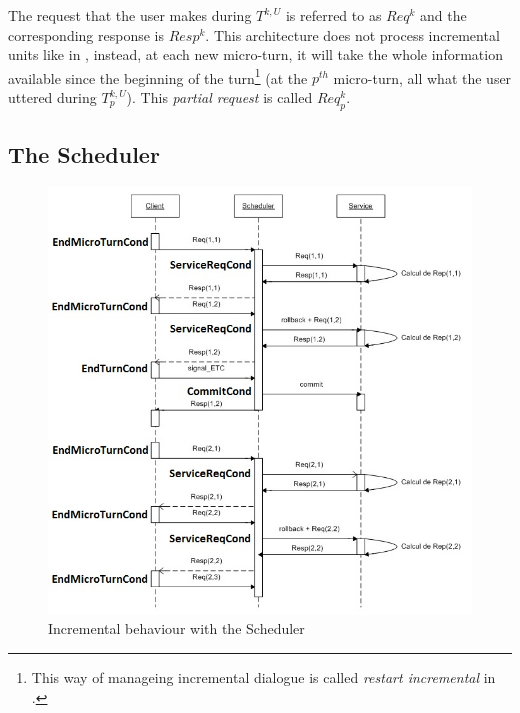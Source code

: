         The request that the user makes during $T^{k,U}$ is referred to as $Req^k$ and the corresponding response is $Resp^k$. This architecture does not process incremental units like in \cite{Schlangen2011}, instead, at each new micro-turn, it will take the whole information available since the beginning of the turn\footnote{This way of manageing incremental dialogue is called \textit{restart incremental} in \cite{Schlangen2011}.} (at the $p^{th}$ micro-turn, all what the user uttered during $T^{k,U}_p$). This \textit{partial request} is called $Req^k_p$.
        
    \subsection{The Scheduler}
    
    	\begin{figure}[ht]
          \centering
          \includegraphics[scale=0.8]{figures/SchedChrono.jpg}
          \caption{Incremental behaviour with the Scheduler}
          \label{fig:schedchrono}
        \end{figure}
    
